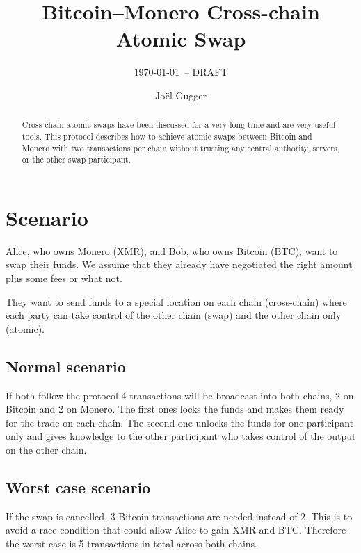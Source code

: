 \documentclass{llncs}
\begin{document}
\title{Bitcoin--Monero Cross-chain Atomic Swap}
\author{Jo\"el Gugger}

\subtitle{{\normalsize\today{\small\ -- DRAFT}}}

\maketitle

\begin{abstract}
    Cross-chain atomic swaps have been discussed for a very long time and are very useful tools. This protocol describes how to achieve atomic swaps between Bitcoin and Monero with two transactions per chain without trusting any central authority, servers, or the other swap participant.
\end{abstract}

\section{Scenario}
Alice, who owns Monero (XMR), and Bob, who owns Bitcoin (BTC), want to swap their funds. We assume that they already have negotiated the right amount plus some fees or what not.

They want to send funds to a special location on each chain (cross-chain) where each party can take control of the other chain (swap) and the other chain only (atomic).

\subsection{Normal scenario}
If both follow the protocol 4 transactions will be broadcast into both chains, 2 on Bitcoin and 2 on Monero. The first ones locks the funds and makes them ready for the trade on each chain. The second one unlocks the funds for one participant only and gives knowledge to the other participant who takes control of the output on the other chain.

\subsection{Worst case scenario}
If the swap is cancelled, 3 Bitcoin transactions are needed instead of 2. This is to avoid a race condition that could allow Alice to gain XMR and BTC. Therefore the worst case is 5 transactions in total across both chains.
\end{document}
